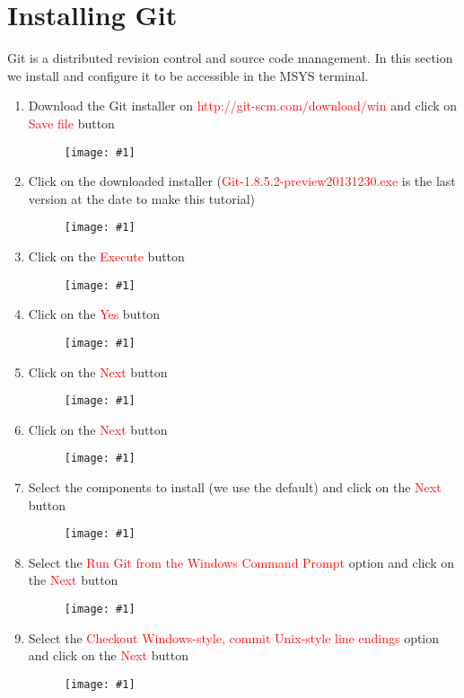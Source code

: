 \documentclass[a4paper]{article}
\newcommand{\FIGURE}[1]
{
	\begin{figure}[!ht]
	\centering
	\texttt{[image: \#1]}
	\end{figure}
}
\newcommand{\RED}[1] {\textcolor{red}{#1}}
\begin{document}
\clearpage

\section{Installing Git}

Git is a distributed revision control and source code management. In this
section we install and configure it to be accessible in the MSYS terminal.

\begin{enumerate}

\item Download the Git installer on \RED{http://git-scm.com/download/win} and
click on \RED{Save file} button
\FIGURE{git-1.png.eps}

\clearpage

\item Click on the downloaded installer (\RED{Git-1.8.5.2-preview20131230.exe}
is the last version at the date to make this tutorial)
\FIGURE{git-2.png.eps}

\item Click on the \RED{Execute} button
\FIGURE{git-3.png.eps}

\clearpage

\item Click on the \RED{Yes} button
\FIGURE{git-4.png.eps}

\item Click on the \RED{Next} button
\FIGURE{git-5.png.eps}

\clearpage

\item Click on the \RED{Next} button
\FIGURE{git-6.png.eps}

\item Select the components to install (we use the default) and click on the
\RED{Next} button
\FIGURE{git-7.png.eps}

\clearpage

\item Select the \RED{Run Git from the Windows Command Prompt} option and click
on the \RED{Next} button
\FIGURE{git-8.png.eps}

\item Select the \RED{Checkout Windows-style, commit Unix-style line endings}
option and click on the \RED{Next} button
\FIGURE{git-9.png.eps}

\end{enumerate}
\end{document}
